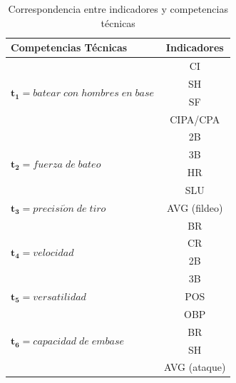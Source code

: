 \begin{table} [H]
	\centering
	\caption{Correspondencia entre indicadores y competencias técnicas} \label{correspondencia-pel}
	\begin{tabular}{|l|c|}
		\hline
		\textbf{Competencias Técnicas}                                          & \textbf{Indicadores} \\ \hline
		\multirow{4}{6.3cm}{$\boldsymbol{t_1}=batear\;con\;hombres\;en\;base $} &          CI          \\
		                                                                        &          SH          \\
		                                                                        &          SF          \\
		                                                                        &       CIPA/CPA       \\ \hline
		\multirow{4}{6.3cm}{$\boldsymbol{t_2}=fuerza\;de\;bateo $}              &          2B          \\
		                                                                        &          3B          \\
		                                                                        &          HR          \\
		                                                                        &         SLU          \\ \hline
		$\boldsymbol{t_3}= precisi\acute{o}n\;de\;tiro $                        &     AVG (fildeo)     \\ \hline
		\multirow{4}{6.3cm}{$\boldsymbol{t_4}= velocidad $}                     &          BR          \\
		                                                                        &          CR          \\
		                                                                        &          2B          \\
		                                                                        &          3B          \\ \hline
		$\boldsymbol{t_5}= versatilidad $                                       &         POS          \\ \hline
		\multirow{4}{6.3cm}{$\boldsymbol{t_6}=capacidad\;de\;embase$}           &         OBP          \\
		                                                                        &          BR          \\
		                                                                        &          SH          \\
		                                                                        &     AVG (ataque)     \\ \hline
	\end{tabular}
\end{table}

